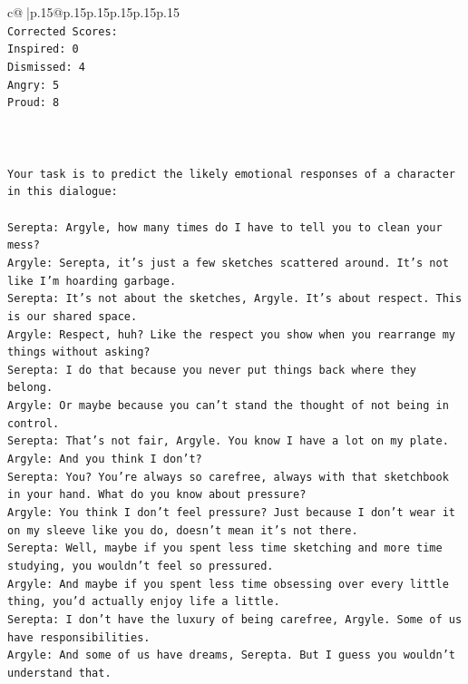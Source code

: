 \documentclass{article}
\begin{document}
{\begin{supertabular}{c@{$\;$}|p{.15\linewidth}@{}p{.15\linewidth}p{.15\linewidth}p{.15\linewidth}p{.15\linewidth}p{.15\linewidth}}
{{{\\ 
\texttt{Corrected Scores:} \\
\texttt{Inspired: 0} \\
\texttt{Dismissed: 4} \\
\texttt{Angry: 5} \\
\texttt{Proud: 8} \\
\\ 
\\ 
\\ 
\texttt{Your task is to predict the likely emotional responses of a character in this dialogue:} \\
\\ 
\texttt{Serepta: Argyle, how many times do I have to tell you to clean your mess? } \\
\texttt{Argyle: Serepta, it's just a few sketches scattered around. It's not like I'm hoarding garbage.} \\
\texttt{Serepta: It's not about the sketches, Argyle. It's about respect. This is our shared space.} \\
\texttt{Argyle: Respect, huh? Like the respect you show when you rearrange my things without asking?} \\
\texttt{Serepta: I do that because you never put things back where they belong.} \\
\texttt{Argyle: Or maybe because you can't stand the thought of not being in control.} \\
\texttt{Serepta: That's not fair, Argyle. You know I have a lot on my plate.} \\
\texttt{Argyle: And you think I don't? } \\
\texttt{Serepta: You? You're always so carefree, always with that sketchbook in your hand. What do you know about pressure?} \\
\texttt{Argyle: You think I don't feel pressure? Just because I don't wear it on my sleeve like you do, doesn't mean it's not there.} \\
\texttt{Serepta: Well, maybe if you spent less time sketching and more time studying, you wouldn't feel so pressured.} \\
\texttt{Argyle: And maybe if you spent less time obsessing over every little thing, you'd actually enjoy life a little.} \\
\texttt{Serepta: I don't have the luxury of being carefree, Argyle. Some of us have responsibilities.} \\
\texttt{Argyle: And some of us have dreams, Serepta. But I guess you wouldn't understand that.} \\
}}}
\end{supertabular}}
\end{document}
